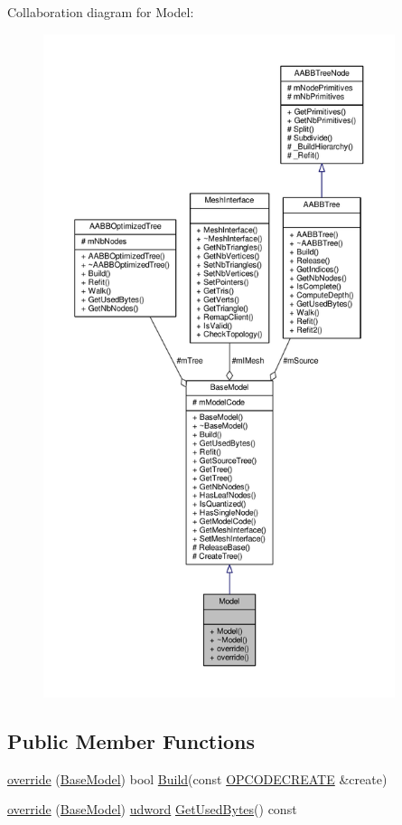 Collaboration diagram for Model\+:
\nopagebreak
\begin{figure}[H]
\begin{center}
\leavevmode
\includegraphics[height=550pt]{d7/dfb/classModel__coll__graph}
\end{center}
\end{figure}
\subsection*{Public Member Functions}
\begin{DoxyCompactItemize}
\item 
\hyperlink{classModel_a89b90791569d00d04d75ef6ad3aba336}{override} (\hyperlink{classBaseModel}{Base\+Model}) bool \hyperlink{classBaseModel_ab2692ac2ec9c0c8c452d73f3a0bd341b}{Build}(const \hyperlink{structOPCODECREATE}{O\+P\+C\+O\+D\+E\+C\+R\+E\+A\+TE} \&create)
\item 
\hyperlink{classModel_a044b13eee3f98b4417597bd657ab4911}{override} (\hyperlink{classBaseModel}{Base\+Model}) \hyperlink{IceTypes_8h_a44c6f1920ba5551225fb534f9d1a1733}{udword} \hyperlink{classBaseModel_a714251e9cd861e4e304f5740c75a5b74}{Get\+Used\+Bytes}() const 
\end{DoxyCompactItemize}
